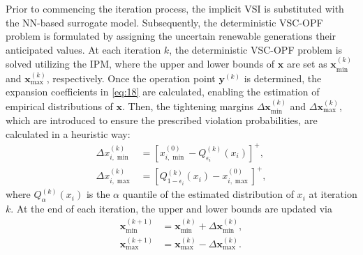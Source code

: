 \documentclass[journal]{IEEEtran}
\theoremstyle{definition}
\theoremstyle{remark}
\begin{document}
Prior to commencing the iteration process, the implicit VSI is substituted with the NN-based surrogate model. Subsequently, the deterministic VSC-OPF problem is formulated by assigning the uncertain renewable generations their anticipated values. At each iteration $k$, the deterministic VSC-OPF problem is solved utilizing the IPM, where the upper and lower bounds of $\boldsymbol{x}$ are set as $\boldsymbol{x}_{\min}^{(k)}$ and $\boldsymbol{x}_{\max}^{(k)}$, respectively. Once the operation point $\boldsymbol{y}^{(k)}$ is determined, the expansion coefficients in \eqref{eq:18} are calculated, enabling the estimation of empirical distributions of $\boldsymbol{x}$. 
Then, the tightening margins $\Delta\boldsymbol{x}_{\min}^{(k)}$ and $\Delta\boldsymbol{x}_{\max}^{(k)}$, which are introduced to ensure the prescribed violation probabilities, are calculated in a heuristic way:  
\begin{subequations}\label{eq:26}
    \begin{align}
        \Delta x_{i,\min}^{(k)}&=\left[x_{i,\min}^{(0)}-Q_{\epsilon_i}^{(k)}\left(x_i\right)\right]^+,\\
        \Delta x_{i,\max}^{(k)}&=\left[Q_{1-\epsilon_i}^{(k)}\left(x_i\right)-x_{i,\max}^{(0)}\right]^+,
    \end{align}
\end{subequations}
where $Q_{\alpha}^{(k)}(x_i)$ is the $\alpha$ quantile of the estimated distribution of $x_i$ at iteration $k$.
At the end of each iteration, the upper and lower bounds are updated via
\begin{subequations}\label{eq:27}
    \begin{align}
        \boldsymbol{x}_{\min}^{(k+1)}&=\boldsymbol{x}_{\min}^{(k)}+\Delta\boldsymbol{x}_{\min}^{(k)},\\
        \boldsymbol{x}_{\max}^{(k+1)}&=\boldsymbol{x}_{\max}^{(k)}-\Delta\boldsymbol{x}_{\max}^{(k)}.
    \end{align}
\end{subequations}
\end{document}
